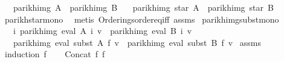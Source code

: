 \begin{isabellebody}
\ \ \ {\isachardoublequoteopen}parikh{\isacharunderscore}{\kern0pt}img\ A\ {\isacharequal}{\kern0pt}\ parikh{\isacharunderscore}{\kern0pt}img\ B{\isachardoublequoteclose}\isanewline
\ \ \ {\isachardoublequoteopen}parikh{\isacharunderscore}{\kern0pt}img\ {\isacharparenleft}{\kern0pt}star\ A{\isacharparenright}{\kern0pt}\ {\isacharequal}{\kern0pt}\ parikh{\isacharunderscore}{\kern0pt}img\ {\isacharparenleft}{\kern0pt}star\ B{\isacharparenright}{\kern0pt}{\isachardoublequoteclose}\isanewline
%
\isadelimproof
\ \ %
\endisadelimproof
%
\isatagproof
{}\isamarkupfalse%
\ parikh{\isacharunderscore}{\kern0pt}star{\isacharunderscore}{\kern0pt}mono\ \isamarkupfalse%
\ {\isacharparenleft}{\kern0pt}metis\ Orderings{\isachardot}{\kern0pt}order{\isacharunderscore}{\kern0pt}eq{\isacharunderscore}{\kern0pt}iff\ assms{\isacharparenright}{\kern0pt}%
\endisatagproof
{\isafoldproof}%
%
\isadelimproof
\isanewline
%
\endisadelimproof
\isanewline
\isanewline
{}\isamarkupfalse%
\ parikh{\isacharunderscore}{\kern0pt}img{\isacharunderscore}{\kern0pt}subst{\isacharunderscore}{\kern0pt}mono{\isacharcolon}{\kern0pt}\isanewline
\ \ \ {\isachardoublequoteopen}{\isasymforall}i{\isachardot}{\kern0pt}\ parikh{\isacharunderscore}{\kern0pt}img\ {\isacharparenleft}{\kern0pt}eval\ {\isacharparenleft}{\kern0pt}A\ i{\isacharparenright}{\kern0pt}\ v{\isacharparenright}{\kern0pt}\ {\isasymsubseteq}\ parikh{\isacharunderscore}{\kern0pt}img\ {\isacharparenleft}{\kern0pt}eval\ {\isacharparenleft}{\kern0pt}B\ i{\isacharparenright}{\kern0pt}\ v{\isacharparenright}{\kern0pt}{\isachardoublequoteclose}\isanewline
\ \ \ {\isachardoublequoteopen}parikh{\isacharunderscore}{\kern0pt}img\ {\isacharparenleft}{\kern0pt}eval\ {\isacharparenleft}{\kern0pt}subst\ A\ f{\isacharparenright}{\kern0pt}\ v{\isacharparenright}{\kern0pt}\ {\isasymsubseteq}\ parikh{\isacharunderscore}{\kern0pt}img\ {\isacharparenleft}{\kern0pt}eval\ {\isacharparenleft}{\kern0pt}subst\ B\ f{\isacharparenright}{\kern0pt}\ v{\isacharparenright}{\kern0pt}{\isachardoublequoteclose}\isanewline
%
\isadelimproof
%
\endisadelimproof
%
\isatagproof
{}\isamarkupfalse%
\ assms\ \isamarkupfalse%
\ {\isacharparenleft}{\kern0pt}induction\ f{\isacharparenright}{\kern0pt}\isanewline
\ \ \isamarkupfalse%
\ {\isacharparenleft}{\kern0pt}Concat\ f{}\ f{}{\isacharparenright}{\kern0pt}\isanewline
\ \ \isamarkupfalse%

\end{isabellebody}
